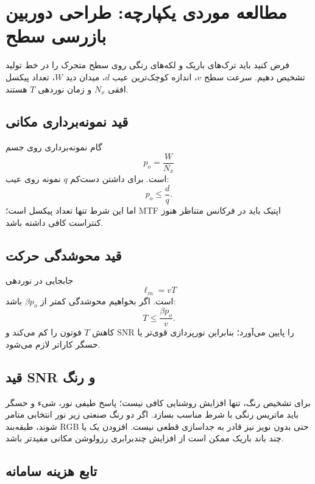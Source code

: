 \documentclass[12pt,openany,oneside]{book}
\begin{document}
\section{مطالعه موردی یکپارچه: طراحی دوربین بازرسی سطح}

فرض کنید باید ترک‌های باریک و لکه‌های رنگی روی سطح متحرک را در خط تولید تشخیص دهیم. سرعت سطح
\(v\)، اندازه کوچک‌ترین عیب \(d\)، میدان دید \(W\)، تعداد پیکسل افقی \(N_x\) و زمان نوردهی \(T\)
هستند.

\subsection{قید نمونه‌برداری مکانی}

گام نمونه‌برداری روی جسم
\begin{equation}
p_o=\frac{W}{N_x}
\end{equation}
است. برای داشتن دست‌کم \(q\) نمونه روی عیب:
\begin{equation}
p_o\le\frac{d}{q}.
\label{eq:defect-sampling}
\end{equation}
اما این شرط تنها تعداد پیکسل است؛ MTF اپتیک باید در فرکانس متناظر هنوز کنتراست کافی داشته باشد.

\subsection{قید محوشدگی حرکت}

جابجایی در نوردهی
\begin{equation}
\ell_m=vT
\end{equation}
است. اگر بخواهیم محوشدگی کمتر از \(\beta p_o\) باشد:
\begin{equation}
T\le\frac{\beta p_o}{v}.
\label{eq:exposure-motion}
\end{equation}
کاهش \(T\) فوتون را کم می‌کند و SNR را پایین می‌آورد؛ بنابراین نورپردازی قوی‌تر یا حسگر کاراتر لازم
می‌شود.

\subsection{قید SNR و رنگ}

برای تشخیص رنگ، تنها افزایش روشنایی کافی نیست؛ پاسخ طیفی نور، شیء و حسگر باید ماتریس رنگی با شرط
مناسب بسازد. اگر دو رنگ صنعتی زیر نور انتخابی متامر شوند، طبقه‌بند RGB حتی بدون نویز نیز قادر به
جداسازی قطعی نیست. افزودن یک یا چند باند باریک ممکن است از افزایش چندبرابری رزولوشن مکانی مفیدتر باشد.

\subsection{تابع هزینه سامانه}
\end{document}
